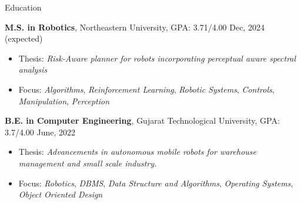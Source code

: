 \documentclass{resume}
\newcommand{\smallspace}{\hspace{0.2em}}
\begin{document}
\fancyheadoffset[RO]{5em}
\fancyfootoffset[RO]{0cm}
\thispagestyle{firstpage}

\begin{rSection}{Education}

{\textbf {M.S. in Robotics}}, Northeastern University, GPA: 3.71/4.00 \hfill {Dec, 2024 (expected)} 
\begin{itemize}
  \item[] \vspace{-0.5em} \hspace{-1.0em} Thesis: \emph{Risk-Aware planner for robots incorporating perceptual aware spectral analysis}
  \item[] \vspace{-0.5em} \hspace{-1.0em} Focus: \emph{Algorithms}, \smallspace \emph{Reinforcement Learning}, \smallspace \emph{Robotic Systems}, \smallspace \emph{Controls}, \smallspace \emph{Manipulation}, \smallspace \emph{Perception}
\end{itemize}


{\bf B.E. in Computer Engineering}, Gujarat Technological University, GPA: 3.7/4.00 \hfill {June, 2022} 
\begin{itemize}
    \item[] \vspace{-0.5em} \hspace{-1.0em} Thesis: \emph{Advancements in autonomous mobile robots for warehouse management and small scale industry.}
    \item[] \vspace{-0.5em} \hspace{-1.0em} Focus: \emph{Robotics}, \smallspace \emph{DBMS}, \smallspace \emph{Data Structure and Algorithms}, \smallspace \emph{Operating Systems}, \smallspace \emph{Object Oriented Design}
\end{itemize}
\end{rSection}
\end{document}
